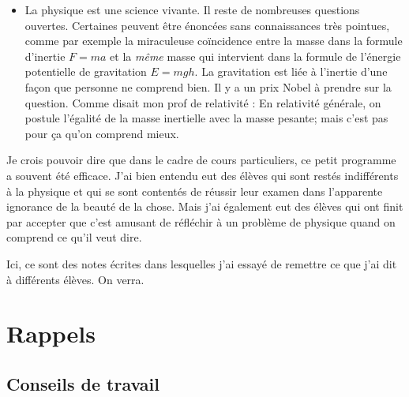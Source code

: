 \documentclass[a4paper,12pt]{book}
\theoremstyle{mes_exemples}	\newtheorem{exemple}[numtho]{Exemple}
\theoremstyle{mes_tho}
\begin{document}
\begin{itemize}
\item La physique est une science vivante. Il reste de nombreuses questions ouvertes. Certaines peuvent être énoncées sans connaissances très pointues, comme par exemple la miraculeuse coïncidence entre la masse dans la formule d'inertie $F=ma$ et la \emph{même} masse qui intervient dans la formule de l'énergie potentielle de gravitation $E=mgh$. La gravitation est liée à l'inertie d'une façon que personne ne comprend bien. Il y a un prix Nobel à prendre sur la question. Comme disait mon prof de relativité : \og En relativité générale, on postule l'égalité de la masse inertielle avec la masse pesante; mais c'est pas pour ça qu'on comprend mieux\fg.
\end{itemize}
Je crois pouvoir dire que dans le cadre de cours particuliers, ce petit programme a souvent été efficace. J'ai bien entendu eut des élèves qui sont restés indifférents à la physique et qui se sont contentés de réussir leur examen dans l'apparente ignorance de la beauté de la chose. Mais j'ai également eut des élèves qui ont finit par accepter que c'est amusant de réfléchir à un problème de physique quand on comprend ce qu'il veut dire.

Ici, ce sont des notes écrites dans lesquelles j'ai essayé de remettre ce que j'ai dit à différents élèves. On verra.

\section{Rappels}

\subsection*{Conseils de travail}
\end{document}
